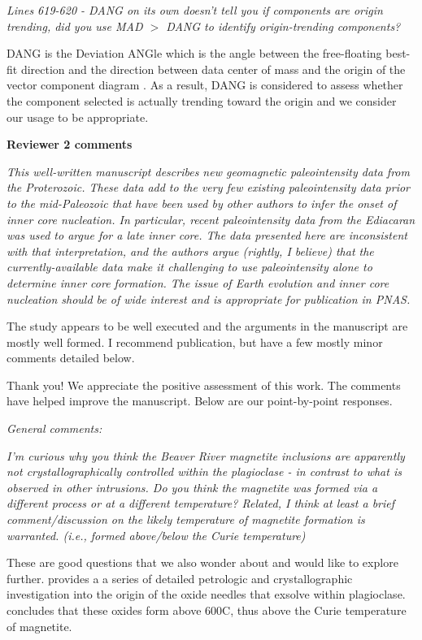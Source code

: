 \documentclass[11pt, letterpaper]{article}
\begin{document}
\begin{flushleft}
\textit{Lines 619-620 - DANG on its own doesn't tell you if components are origin trending, did you use MAD $>$ DANG to identify origin-trending components?}

DANG is the Deviation ANGle which is the angle between the free-floating best-fit direction and the direction between data center of mass and the origin of the vector component diagram  \citep{Tauxe2004a}. As a result, DANG is considered to assess whether the component selected is actually trending toward the origin and we consider our usage to be appropriate. 

\clearpage


\textbf{\Large Reviewer 2 comments}

\itshape
This well-written manuscript describes new geomagnetic paleointensity data from the Proterozoic. These data add to the very few existing paleointensity data prior to the mid-Paleozoic that have been used by other authors to infer the onset of inner core nucleation. In particular, recent paleointensity data from the Ediacaran was used to argue for a late inner core. The data presented here are inconsistent with that interpretation, and the authors argue (rightly, I believe) that the currently-available data make it challenging to use paleointensity alone to determine inner core formation. The issue of Earth evolution and inner core nucleation should be of wide interest and is appropriate for publication in PNAS.

The study appears to be well executed and the arguments in the manuscript are mostly well formed. I recommend publication, but have a few mostly minor comments detailed below.
\upshape

Thank you! We appreciate the positive assessment of this work. The comments have helped improve the manuscript. Below are our point-by-point responses.

\textit{General comments:}

\textit{I'm curious why you think the Beaver River magnetite inclusions are apparently not crystallographically controlled within the plagioclase - in contrast to what is observed in other intrusions. Do you think the magnetite was formed via a different process or at a different temperature? Related, I think at least a brief comment/discussion on the likely temperature of magnetite formation is warranted. (i.e., formed above/below the Curie temperature)}

These are good questions that we also wonder about and would like to explore further. \cite{Ageeva2016a, Ageeva2017a, Ageeva2020a, Ageeva2022a,Bian2021a} provides a a series of detailed petrologic and crystallographic investigation into the origin of the oxide needles that exsolve within plagioclase. \cite{Bian2021a} concludes that these oxides form above 600\textdegree C, thus above the Curie temperature of magnetite.


\end{flushleft}
\end{document}
